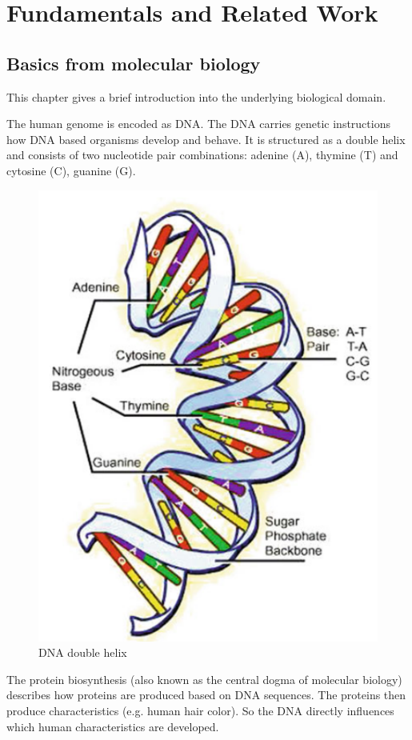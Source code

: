 \section{Fundamentals and Related Work} \label{fundamentals}

\subsection{Basics from molecular biology} \label{fundamentalsA0}

This chapter gives a brief introduction into the underlying biological domain.

The human genome is encoded as \ac{DNA}. The \ac{DNA} carries genetic instructions how \ac{DNA} based organisms develop and behave. It is structured as a double helix and consists of two nucleotide pair combinations: adenine (A), thymine (T) and cytosine (C), guanine (G). \cite[p. 8]{10.5555/1965281}

\begin{figure}[ht]
	\centering
	\includegraphics[width=0.5\linewidth]{figures/dnaDoubleHelix.png}
	\caption{\ac{DNA} double helix \cite[p. 8]{10.5555/1965281}}
	\label{dna_double_helix}
\end{figure}

The protein biosynthesis (also known as the central dogma of molecular biology) describes how proteins are produced based on \ac{DNA} sequences. The proteins then produce characteristics (e.g. human hair color). So the \ac{DNA} directly influences which human characteristics are developed.  \cite[p. 6]{schererStatisticalGeneticsGenetic2021}

